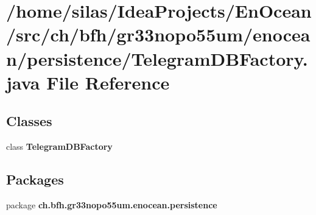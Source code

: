 \section{/home/silas/\+Idea\+Projects/\+En\+Ocean/src/ch/bfh/gr33nopo55um/enocean/persistence/\+Telegram\+D\+B\+Factory.java File Reference}
\label{TelegramDBFactory_8java}
\subsection*{Classes}
\begin{DoxyCompactItemize}
\item 
class {\bf Telegram\+D\+B\+Factory}
\end{DoxyCompactItemize}
\subsection*{Packages}
\begin{DoxyCompactItemize}
\item 
package {\bf ch.\+bfh.\+gr33nopo55um.\+enocean.\+persistence}
\end{DoxyCompactItemize}
